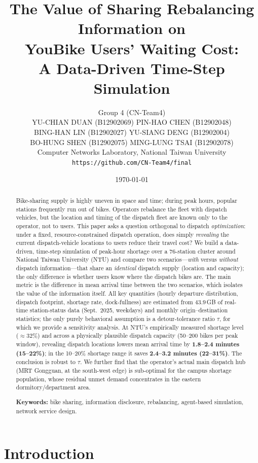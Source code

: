 \documentclass[11pt,a4paper]{article}
\title{\vspace{-1.2em}\textbf{The Value of Sharing Rebalancing Information on\\
YouBike Users' Waiting Cost:\\ A Data-Driven Time-Step Simulation}}
\author{Group 4 (CN-Team4)\\[0.45em]
\small YU-CHIAN DUAN (B12902069) \quad PIN-HAO CHEN (B12902048)\\
\small BING-HAN LIN (B12902027) \quad YU-SIANG DENG (B12902004)\\
\small BO-HUNG SHEN (B12902075) \quad MING-LUNG TSAI (B12902078)\\[0.45em]
\normalsize Computer Networks Laboratory, National Taiwan University\\
\small\texttt{https://github.com/CN-Team4/final}}
\date{\today}
\begin{document}
\maketitle

\begin{abstract}
\noindent
Bike-sharing supply is highly uneven in space and time; during peak hours, popular stations frequently run out of bikes.
Operators rebalance the fleet with dispatch vehicles, but the location and timing of the dispatch fleet are known only to the
operator, not to users. This paper asks a question orthogonal to dispatch \emph{optimization}: under a fixed,
resource-constrained dispatch operation, does simply \emph{revealing} the current dispatch-vehicle locations to users reduce
their travel cost? We build a data-driven, time-step simulation of peak-hour shortage over a 76-station cluster around National
Taiwan University (NTU) and compare two scenarios---\emph{with} versus \emph{without} dispatch information---that share an
\emph{identical} dispatch supply (location and capacity); the only difference is whether users know where the dispatch bikes are.
The main metric is the difference in mean arrival time between the two scenarios, which isolates the value of the information
itself. All key quantities (hourly departure distribution, dispatch footprint, shortage rate, dock-fullness) are estimated from
$43.9$\,GB of real-time station-status data (Sept.\ 2025, weekdays) and monthly origin--destination statistics; the only purely
behavioral assumption is a detour-tolerance ratio $\tau$, for which we provide a sensitivity analysis. At NTU's empirically
measured shortage level ($\approx$32\%) and across a physically plausible dispatch capacity (50--200 bikes per peak window),
revealing dispatch locations lowers mean arrival time by \textbf{1.8--2.4 minutes (15--22\%)}; in the 10--20\% shortage range it
saves \textbf{2.4--3.2 minutes (22--31\%)}. The conclusion is robust to $\tau$. We further find that the operator's actual main
dispatch hub (MRT Gongguan, at the south-west edge) is sub-optimal for the campus shortage population, whose residual unmet
demand concentrates in the eastern dormitory/department area.

\smallskip
\noindent\textbf{Keywords:} bike sharing, information disclosure, rebalancing, agent-based simulation, network service design.
\end{abstract}

\section{Introduction}
\end{document}
